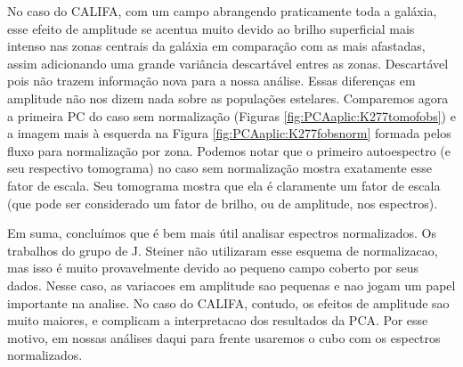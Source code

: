 No caso do CALIFA, com um campo abrangendo praticamente toda a galáxia, esse efeito de amplitude se acentua muito
devido ao brilho superficial mais intenso nas zonas centrais da galáxia em comparação com as mais afastadas, assim
adicionando uma grande variância descartável entres as zonas. Descartável pois não trazem informação nova para a nossa
análise. Essas diferenças em amplitude não nos dizem nada sobre as populações estelares. Comparemos agora a primeira PC
do caso sem normalização (Figuras \ref{fig:PCAaplic:K277tomofobs}) e a imagem mais à esquerda na Figura
\ref{fig:PCAaplic:K277fobsnorm} formada pelos fluxo para normalização por zona. Podemos notar que o primeiro autoespectro
(e seu respectivo tomograma) no caso sem normalização mostra exatamente esse fator de escala. Seu tomograma mostra que
ela é claramente um fator de escala (que pode ser considerado um fator de brilho, ou de amplitude, nos espectros). 

Em suma, concluímos que é bem mais útil analisar espectros normalizados. 
Os trabalhos do grupo de J. Steiner não utilizaram esse esquema de normalizacao, mas isso é muito provavelmente devido ao pequeno campo coberto por seus dados. Nesse caso, as variacoes em amplitude sao pequenas e nao jogam um papel importante na analise. No caso do CALIFA, contudo, os efeitos de amplitude sao muito maiores, e complicam a interpretacao dos resultados da PCA. Por
esse motivo, em nossas análises daqui para frente usaremos o cubo com os espectros normalizados.

